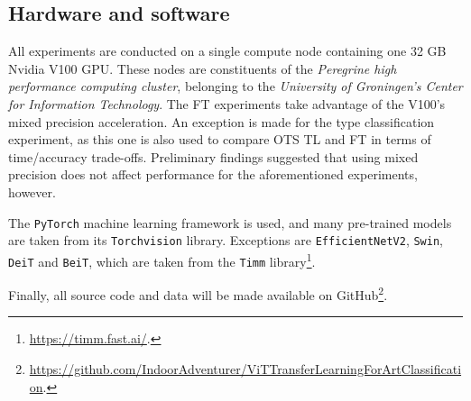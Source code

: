 \subsection{Hardware and software}
All experiments are conducted on a single compute node containing one 32 GB Nvidia V100 GPU. These nodes are constituents of the \textit{Peregrine high performance computing cluster}, belonging to the \textit{University of Groningen's Center for Information Technology}. The FT experiments take advantage of the V100's mixed precision acceleration. An exception is made for the type classification experiment, as this one is also used to compare OTS TL and FT in terms of time/accuracy trade-offs. Preliminary findings suggested that using mixed precision does not affect performance for the aforementioned experiments, however.

The \texttt{PyTorch} machine learning framework is used, and many pre-trained models are taken from its \texttt{Torchvision} library. Exceptions are \texttt{EfficientNetV2}, \texttt{Swin}, \texttt{DeiT} and \texttt{BeiT}, which are taken from the \texttt{Timm} library\footnote{\url{https://timm.fast.ai/}.}.

Finally, all source code and data will be made available on GitHub\footnote{\url{https://github.com/IndoorAdventurer/ViTTransferLearningForArtClassification}.}.

